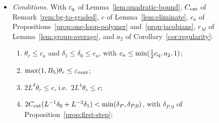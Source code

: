 \begin{remark}
\begin{itemize}
  \begin{itemize}
  \item $\eps_P$ of Theorem~\ref{thm:weak-bg};
  \item $\eps_{\rm ID}$ of Theorem~\ref{thm:ID}, and the thresholds of Sections~\ref{sec:interior}, \ref{sec:nested-walks} and~\ref{sec:interior-lp};
  \item $\eps_0$ and $c'_3/C$ of Section~\ref{sec:AB-proof}, and $\eps_{\rm cc}$ of Section~\ref{sec:complex-references};
  \item $c_5/C$ of Proposition~\ref{prop:action};
  \item the threshold $C'\eps\le\frac12c$ of the proof of Proposition~\ref{prop:dirichlet-hessian}(c);
  \item the threshold of Corollary~\ref{cor:covariance} and Lemma~\ref{lem:coercive-general}, which contains $CL^{3d+1}\eps\le\frac14c_L$, i.e.\ $CL^{13}\eps\le\frac14c_L$ in $d=4$;
  \item $\frac1{20}$, the bound on $\eps+C\delta_c$ in the proof of Proposition~\ref{prop:interaction-pieces}(b);
  \item from Parts~IV and~VII: $\eps_{\rm B}$ of Lemma~\ref{lem:uniformity}(c) at $M=M_0$, the smallness of Corollary~\ref{cor:parts-apply}, and $\eps_*$ of Lemma~\ref{lem:sup-bounds}.
  \end{itemize}
  The thresholds of Section~\ref{sec:tiers} are those of the second item (Proposition~\ref{prop:nl-tiers}), and the first item, $\eps_P$, contains them (proof of Theorem~\ref{thm:weak-bg}).
  Then $\delta_P\le\bar\delta$ is chosen as in Proposition~\ref{prop:complex-ext}, whose smallness conditions are stated with $\eps_{\max}$.
\item \emph{Conditions.} With $c_{\rm q}$ of Lemma~\ref{lem:quadratic-bound}, $C_{\rm ext}$ of Remark~\ref{rem:bg-to-graded}, $c$ of Lemma~\ref{lem:eliminate}, $c_a$ of Propositions~\ref{prop:one-loop-polymer} and~\ref{prop:jacobians}, $r_M$ of Lemma~\ref{lem:group-average}, and $a_2$ of Corollary~\ref{cor:regularity}:
\begin{enumerate}[label=(DC\arabic*)]
\item $\theta_r\le c_a$ and $\delta_1\le\delta_0\le c_a$, with $c_a\le\min(\frac12c_{\rm q},a_2,1)$;
\item $\max(1,B_5)\theta_r\le\varepsilon_{\max}$;
\item $2L^d\theta_r\le c$, i.e.\ $2L^4\theta_r\le c$;
\item $2C_{\rm ext}(L^{-1}\delta_0+L^{-2}\delta_1)<\min(\delta_P,\delta_{P,0})$, with $\delta_{P,0}$ of Proposition~\ref{prop:first-step};

\end{enumerate}
\end{itemize}
\end{remark}
